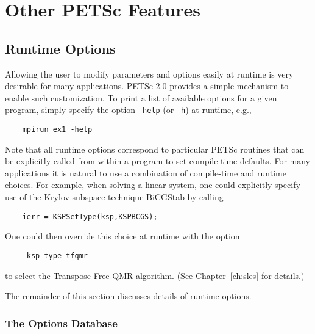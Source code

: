\chapter{Other PETSc Features}

\section{Runtime Options}  
\label{sec:options}

Allowing the user to modify parameters and options easily at runtime
is very desirable for many applications.  PETSc 2.0 provides a simple
mechanism to enable such customization.  To print a list of
available options for a given program, simply specify the option 
{\tt -help} (or {\tt -h}) at runtime, e.g.,  
\begin{verbatim}
    mpirun ex1 -help
\end{verbatim}

Note that all runtime options correspond to particular PETSc routines
that can be explicitly called from within a program to set compile-time
defaults.   For many applications it is natural to use a combination
of compile-time and runtime choices.  For example, when solving a linear
system, one could explicitly specify use of the Krylov subspace
technique BiCGStab by calling
\begin{verbatim}
    ierr = KSPSetType(ksp,KSPBCGS);
\end{verbatim}
One could then override this choice at runtime with the option
\begin{verbatim}
    -ksp_type tfqmr
\end{verbatim}
to select the Transpose-Free QMR algorithm. (See Chapter~\ref{ch:sles} for details.)

The remainder of this section discusses details of runtime options.

\subsection{The Options Database}


